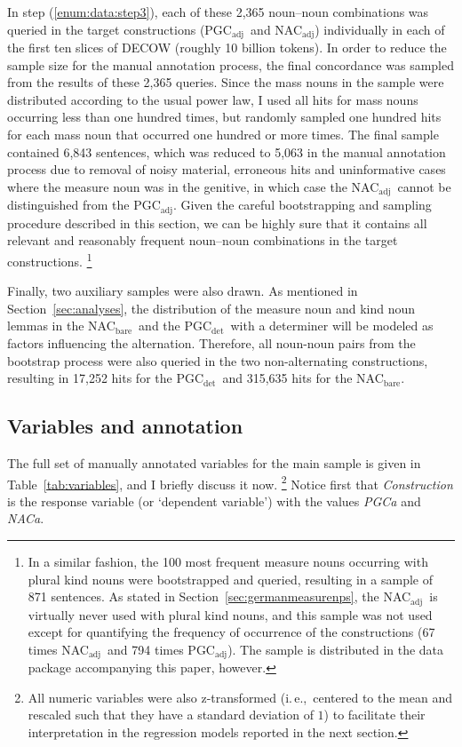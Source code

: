 \documentclass[USenglish]{article}
\newcommand{\ie}{i.\,e.,}
\newcommand{\Sub}[1]{\ensuremath{\mathrm{_{#1}}}}
\newcommand{\NACb}{NAC\Sub{bare}}
\newcommand{\NACa}{NAC\Sub{adj}}
\newcommand{\PGCd}{PGC\Sub{det}}
\newcommand{\PGCa}{PGC\Sub{adj}}
\begin{document}
In step (\ref{enum:data:step3}), each of these 2,365 noun–noun combinations was queried in the target constructions (\PGCa\ and \NACa) individually in each of the first ten slices of DECOW (roughly 10 billion tokens).
In order to reduce the sample size for the manual annotation process, the final concordance was sampled from the results of these 2,365 queries.
Since the mass nouns in the sample were distributed according to the usual power law, I used all hits for mass nouns occurring less than one hundred times, but randomly sampled one hundred hits for each mass noun that occurred one hundred or more times.
The final sample contained 6,843 sentences, which was reduced to 5,063 in the manual annotation process due to removal of noisy material, erroneous hits and uninformative cases where the measure noun was in the genitive, in which case the \NACa\ cannot be distinguished from the \PGCa.
Given the careful bootstrapping and sampling procedure described in this section, we can be highly sure that it contains all relevant and reasonably frequent noun–noun combinations in the target constructions.%
\footnote{In a similar fashion, the 100 most frequent measure nouns occurring with plural kind nouns were bootstrapped and queried, resulting in a sample of 871 sentences.
As stated in Section~\ref{sec:germanmeasurenps}, the \NACa\ is virtually never used with plural kind nouns, and this sample was not used except for quantifying the frequency of occurrence of the constructions (67 times \NACa\ and 794 times \PGCa).
The sample is distributed in the data package accompanying this paper, however.
}

Finally, two auxiliary samples were also drawn.
As mentioned in Section~\ref{sec:analyses}, the distribution of the measure noun and kind noun lemmas in the \NACb\ and the \PGCd\ with a determiner will be modeled as factors influencing the alternation.
Therefore, all noun-noun pairs from the bootstrap process were also queried in the two non-alternating constructions, resulting in 17,252 hits for the \PGCd\ and 315,635 hits for the \NACb.



\subsection{Variables and annotation}
\label{sec:annotation}

The full set of manually annotated variables for the main sample is given in Table~\ref{tab:variables}, and I briefly discuss it now.%
\footnote{All numeric variables were also z-transformed (\ie\ centered to the mean and rescaled such that they have a standard deviation of $1$) to facilitate their interpretation in the regression models reported in the next section.}
Notice first that \textit{Construction} is the response variable (or `dependent variable') with the values \textit{PGCa} and \textit{NACa}.
\end{document}
